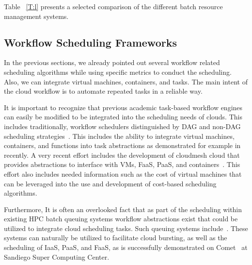\documentclass[final,5p,times,twocolumn]{elsarticle}
\begin{document}
Table ~\ref{T:l} presents a selected comparison of the different batch resource management systems.
 

%





\subsection{Workflow Scheduling Frameworks} 
\label{sec:workflow}

In the previous sections, we already pointed out several workflow related scheduling algorithms while using specific metrics to conduct the scheduling. Also, we can integrate virtual machines, containers, and tasks. The main intent of the cloud workflow is to automate repeated tasks in a reliable way. 

It is important to recognize that previous academic task-based workflow engines can easily be modified to be integrated into the scheduling needs of clouds. This includes traditionally, workflow schedulers distinguished by DAG and non-DAG scheduling strategies~\cite{deelman2005pegasus,deelman2004pegasus,thain2005distributed,las-infogram,las-karajan,las-cogkit-1,las06-workflow-book}. This includes the ability to integrate virtual machines, containers, and functions into task abstractions as demonstrated for example in~\cite{www-pegasus-container,www-cloudmesh-manual} recently. A very recent effort includes the development of cloudmesh cloud that provides abstractions to interface with VMs, FaaS, PaaS, and containers~\cite{www-cloudmesh-manual}. This effort also includes needed information such as the cost of virtual machines that can be leveraged into the use and development of cost-based scheduling algorithms.

Furthermore, It is often an overlooked fact that as part of the scheduling within existing HPC batch queuing systems workflow abstractions exist that could be utilized to integrate cloud scheduling tasks. Such queuing systems include~\cite{www-lsf,www-moab,www-univa-GE-manual,www-pbs-manual}. These systems can naturally be utilized to facilitate cloud bursting, as well as the scheduling of IaaS, PaaS, and FaaS, as is successfully demonstrated on Comet~\cite{las-comet} at Sandiego Super Computing Center.

\end{document}
